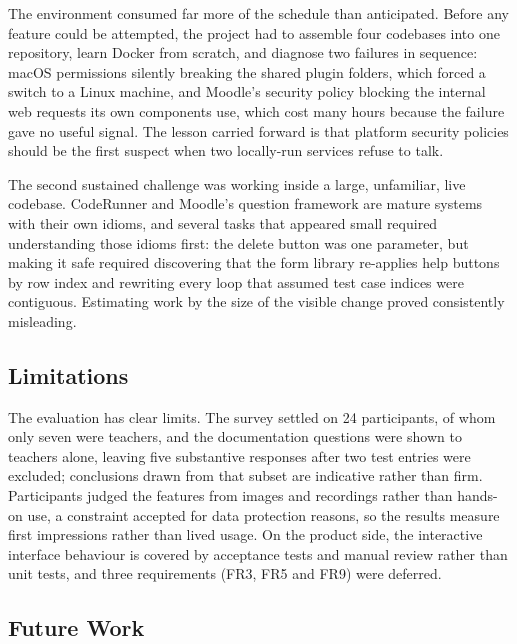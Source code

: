 The environment consumed far more of the schedule than anticipated. Before any feature could be attempted, the project had to assemble four codebases into one repository, learn Docker from scratch, and diagnose two failures in sequence: macOS permissions silently breaking the shared plugin folders, which forced a switch to a Linux machine, and Moodle's security policy blocking the internal web requests its own components use, which cost many hours because the failure gave no useful signal. The lesson carried forward is that platform security policies should be the first suspect when two locally-run services refuse to talk.

The second sustained challenge was working inside a large, unfamiliar, live codebase. CodeRunner and Moodle's question framework are mature systems with their own idioms, and several tasks that appeared small required understanding those idioms first: the delete button was one parameter, but making it safe required discovering that the form library re-applies help buttons by row index and rewriting every loop that assumed test case indices were contiguous. Estimating work by the size of the visible change proved consistently misleading.

\subsection{Limitations}

The evaluation has clear limits. The survey settled on 24 participants, of whom only seven were teachers, and the documentation questions were shown to teachers alone, leaving five substantive responses after two test entries were excluded; conclusions drawn from that subset are indicative rather than firm. Participants judged the features from images and recordings rather than hands-on use, a constraint accepted for data protection reasons, so the results measure first impressions rather than lived usage. On the product side, the interactive interface behaviour is covered by acceptance tests and manual review rather than unit tests, and three requirements (FR3, FR5 and FR9) were deferred.

\subsection{Future Work}

